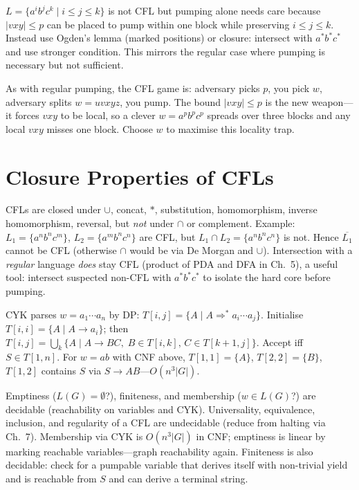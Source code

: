 \begin{example}
$L=\{a^ib^jc^k\mid i\le j\le k\}$ is not CFL but pumping alone needs care because $|vxy|\le p$ can be placed to pump within one block while preserving $i\le j\le k$. Instead use Ogden's lemma (marked positions) or closure: intersect with $a^*b^*c^*$ and use stronger condition. This mirrors the regular case where pumping is necessary but not sufficient.
\end{example}

\begin{remark}
As with regular pumping, the CFL game is: adversary picks $p$, you pick $w$, adversary splits $w=uvxyz$, you pump. The bound $|vxy|\le p$ is the new weapon---it forces $vxy$ to be local, so a clever $w=a^pb^pc^p$ spreads over three blocks and any local $vxy$ misses one block. Choose $w$ to maximise this locality trap.
\end{remark}

\section{Closure Properties of CFLs}
\label{sec:cfl-closure}
CFLs are closed under $\cup$, concat, $*$, substitution, homomorphism, inverse homomorphism, reversal, but \emph{not} under $\cap$ or complement. Example: $L_1=\{a^nb^nc^m\}$, $L_2=\{a^mb^nc^n\}$ are CFL, but $L_1\cap L_2=\{a^nb^nc^n\}$ is not. Hence $\overline{L_1}$ cannot be CFL (otherwise $\cap$ would be via De Morgan and $\cup$).
Intersection with a \emph{regular} language \emph{does} stay CFL (product of PDA and DFA in Ch.~5), a useful tool: intersect suspected non-CFL with $a^*b^*c^*$ to isolate the hard core before pumping.

\begin{example}
CYK parses $w=a_1\cdots a_n$ by DP: $T[i,j]=\{A\mid A\Rightarrow^* a_i\cdots a_j\}$. Initialise $T[i,i]=\{A\mid A\to a_i\}$; then $T[i,j]=\bigcup_{k}\{A\mid A\to BC,\;B\in T[i,k],\,C\in T[k+1,j]\}$. Accept iff $S\in T[1,n]$. For $w=ab$ with CNF above, $T[1,1]=\{A\}$, $T[2,2]=\{B\}$, $T[1,2]$ contains $S$ via $S\to AB$---$O(n^3|G|)$.
\end{example}

\begin{theorem}
Emptiness ($L(G)=\emptyset$?), finiteness, and membership ($w\in L(G)$?) are decidable (reachability on variables and CYK). Universality, equivalence, inclusion, and regularity of a CFL are undecidable (reduce from halting via Ch.~7).
Membership via CYK is $O(n^3|G|)$ in CNF; emptiness is linear by marking reachable variables---graph reachability again.
Finiteness is also decidable: check for a pumpable variable that derives itself with non-trivial yield and is reachable from $S$ and can derive a terminal string.
\end{theorem}

